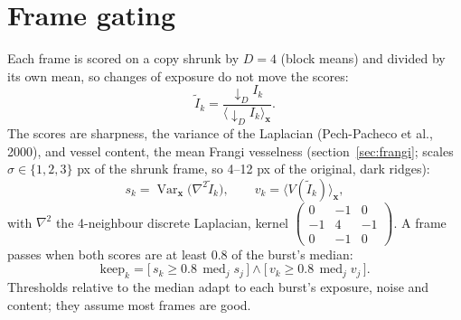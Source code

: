 \documentclass[11pt]{article}
\newcommand{\x}{\mathbf{x}}
\begin{document}
\section{Frame gating}\label{sec:gate}

Each frame is scored on a copy shrunk by $D = 4$ (block means) and divided by its own mean, so changes of exposure
do not move the scores:
\begin{equation}
  \tilde I_k = \frac{{\downarrow_D} I_k}{\bigl\langle {\downarrow_D} I_k \bigr\rangle_\x}.
\end{equation}
The scores are sharpness, the variance of the Laplacian (Pech-Pacheco et al., 2000), and vessel content, the mean Frangi vesselness
(section~\ref{sec:frangi}; scales $\sigma \in \{1, 2, 3\}$ px of the shrunk frame, so 4--12 px of the original,
dark ridges):
\begin{equation}
  s_k = \operatorname{Var}_\x\!\bigl(\nabla^2 \tilde I_k\bigr),
  \qquad
  v_k = \bigl\langle V(\tilde I_k) \bigr\rangle_\x,
\end{equation}
with $\nabla^2$ the 4-neighbour discrete Laplacian, kernel
$\left(\begin{smallmatrix} 0 & -1 & 0 \\ -1 & 4 & -1 \\ 0 & -1 & 0 \end{smallmatrix}\right)$. A frame passes when both
scores are at least 0.8 of the burst's median:
\begin{equation}
  \mathrm{keep}_k = \bigl[\, s_k \ge 0.8\, \operatorname{med}_j s_j \,\bigr] \wedge \bigl[\, v_k \ge 0.8\, \operatorname{med}_j v_j \,\bigr].
\end{equation}
Thresholds relative to the median adapt to each burst's exposure, noise and content; they assume most frames are
good.
\end{document}
